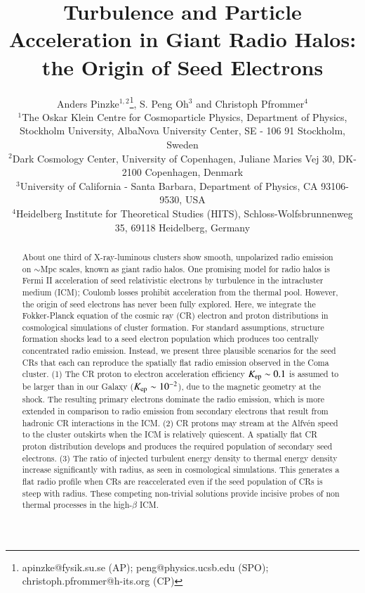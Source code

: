 \documentclass[useAMS,usenatbib]{mn2e}
\title[Origin of Seed Electrons]{Turbulence and Particle Acceleration in Giant Radio Halos: the Origin of Seed Electrons}
\author[A. Pinzke, S. Peng Oh and C. Pfrommer] 
{Anders Pinzke$^{1,2}$\thanks{apinzke@fysik.su.se (AP); peng@physics.ucsb.edu (SPO); christoph.pfrommer@h-its.org (CP)}, S. Peng Oh$^{3}$ and Christoph Pfrommer$^{4}$\footnotemark[1]\\
$^{1}$The Oskar Klein Centre for Cosmoparticle Physics, Department
  of Physics, Stockholm University, AlbaNova University Center, SE - 106 91
  Stockholm, Sweden\\
$^{2}$Dark Cosmology Center, University of Copenhagen,
  Juliane Maries Vej 30, DK-2100 Copenhagen, Denmark\\
  $^{3}$University of California - Santa Barbara,
  Department of Physics, CA 93106-9530, USA\\
$^{4}$Heidelberg Institute for Theoretical Studies
  (HITS), Schloss-Wolfsbrunnenweg 35, 69118 Heidelberg, Germany}
\begin{document}
\pagerange{\pageref{firstpage}--\pageref{lastpage}} 
\maketitle
\label{firstpage}



 
\begin{abstract}
  About one third of X-ray-luminous clusters show smooth, unpolarized
  radio emission on $\sim$Mpc scales, known as giant radio halos. One
  promising model for radio halos is Fermi II acceleration of seed
  relativistic electrons by turbulence in the intracluster medium
  (ICM); Coulomb losses prohibit acceleration from the thermal
  pool. However, the origin of seed electrons has never been fully
  explored. Here, we integrate the Fokker-Planck equation of the
  cosmic ray (CR) electron and proton distributions in cosmological
  simulations of cluster formation. For standard assumptions,
  structure formation shocks lead to a seed electron population which
  produces too centrally concentrated radio emission. Instead, we
  present three plausible scenarios for the seed CRs that each
  can reproduce the spatially flat radio emission observed in the Coma
  cluster. (1) The CR proton to electron acceleration efficiency
  $K_{\mathrm{ep}} \sim 0.1$ is assumed to be larger than in our Galaxy
  ($K_{\mathrm{ep}} \sim 10^{-2}$), due to the magnetic geometry at the
  shock. The resulting primary electrons dominate the radio emission,
  which is more extended in comparison to radio emission from
  secondary electrons that result from hadronic CR interactions in the
  ICM. (2) CR protons may stream at the Alfv{\'e}n speed to the
  cluster outskirts when the ICM is relatively quiescent. A spatially
  flat CR proton distribution develops and produces the required
  population of secondary seed electrons. (3) The ratio of injected
  turbulent energy density to thermal energy density increase
  significantly with radius, as seen in cosmological simulations. This
  generates a flat radio profile when CRs are reaccelerated even
  if the seed population of CRs is steep with radius. These competing
  non-trivial solutions provide incisive probes of non thermal
  processes in the high-$\beta$ ICM.
\end{abstract} 

\end{document}
